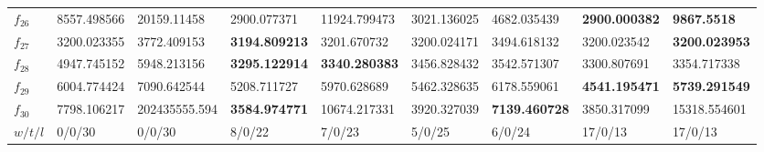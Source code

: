 \begin{table*}[t]
\begin{tabular}{|p{0.8cm}|p{1.6cm}|p{1.6cm}|p{1.6cm}|p{1.6cm}|p{1.6cm}|p{1.6cm}|p{1.6cm}|p{1.6cm}|}
$f_{26}$  & 8557.498566 & 20159.11458 & 2900.077371 & 11924.799473 & 3021.136025 & 4682.035439 & \textbf{2900.000382} & \textbf{9867.5518} \\ 
$f_{27}$  & 3200.023355 & 3772.409153 & \textbf{3194.809213} & 3201.670732 & 3200.024171 & 3494.618132 & 3200.023542 & \textbf{3200.023953} \\ 
$f_{28}$  & 4947.745152 & 5948.213156 & \textbf{3295.122914} & \textbf{3340.280383} & 3456.828432 & 3542.571307 & 3300.807691 & 3354.717338 \\ 
$f_{29}$  & 6004.774424 & 7090.642544 & 5208.711727 & 5970.628689 & 5462.328635 & 6178.559061 & \textbf{4541.195471} & \textbf{5739.291549} \\ 
$f_{30}$  & 7798.106217 & 202435555.594 & \textbf{3584.974771} & 10674.217331 & 3920.327039 & \textbf{7139.460728} & 3850.317099 & 15318.554601 \\ 
\hline
$w/t/l$  & 0/0/30 & 0/0/30 & 8/0/22 & 7/0/23 & 5/0/25 & 6/0/24 & 17/0/13 & 17/0/13 \\
\hline

 \end{tabular}
\end{table*}
\endgroup
